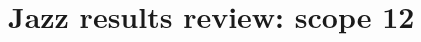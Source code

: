 \documentclass{article}
\begin{document}
\section*{Jazz results review: scope 12}


\clearpage

\clearpage

\end{document}
